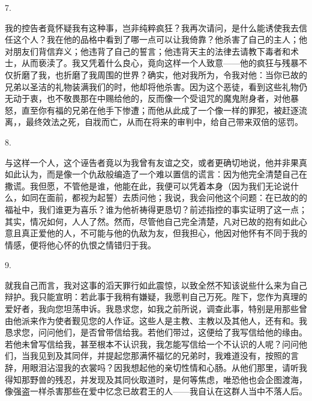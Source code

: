 7. \par

我的控告者竟怀疑我有这种事，岂非纯粹疯狂？我再次请问，是什么能诱使我去信任这个人？我在他的品格中看到了哪一点可以让我倚靠？他杀害了自己的主人；他对朋友们背信弃义；他违背了自己的誓言；他违背天主的法律去请教下毒者和术士，从而亵渎了。我又凭着什么良心，竟向这样一个人致意——他的疯狂与残暴不仅折磨了我，也折磨了我周围的世界？确实，他对我所为，令我对他：当你已故的兄弟以圣洁的礼物装满我们的时，他却将他杀害。因为这个恶徒，看到这些礼物仍无动于衷，也不敬畏那在中赐给他的，反而像一个受诅咒的魔鬼附身者，对他暴怒，直至你有福的兄弟在他手下惨遭；而他从此成了一个像一样的罪犯，被赶逐流离，，最终效法之死，自戕而亡，从而在将来的审判中，给自己带来双倍的惩罚。\par

8. \par

与这样一个人，这个诬告者竟以为我曾有友谊之交，或者更确切地说，他并非果真如此认为，而是像一个仇敌般编造了一个难以置信的谎言：因为他完全清楚自己在撒谎。我但愿，不管他是谁，他能在此，我便可以凭着本身（因为我们无论说什么，如同在面前，都视为起誓）去质问他；我说，我会问他这个问题：在已故的的福祉中，我们谁更为喜乐？谁为他祈祷得更恳切？前述指控的事实证明了这一点；其实，情况如何，人人了然。然而，尽管他自己完全清楚，凡对已故的抱有如此心意且真正爱他的人，不可能与他的仇敌为友，但我担心，他因对他怀有不同于我的情感，便将他心怀的仇恨之情错归于我。\par

9. \par

就我自己而言，我对这事的滔天罪行如此震惊，以致全然不知该说些什么来为自己辩护。我只能宣明：若此事于我稍有嫌疑，我愿判自己万死。陛下，您作为真理的爱好者，我向您坦荡申诉。我恳求您，如我之前所说，调查此事，特别是用那些曾由他派来作为使者觐见您的人作证。这些人是主教、主教以及其他人，还有和。我恳求您，问问他们，是否曾带信给我。若他们带过，这便给了我写信给他的缘由。若他未曾写信给我，甚至根本不认识我，我怎能写信给一个不认识的人呢？问问他们，当我见到及其同伴，并提起您那满怀福忆的兄弟时，我难道没有，按照的言辞，用眼泪沾湿我的衣裳吗？因我想起他的亲切性情和心肠。从他们那里，请听我得知那野兽的残忍，并发现及其同伙取道时，是何等焦虑，唯恐他也会企图渡海，像强盗一样杀害那些在爱中忆念已故君王的人——我自认在这群人当中不落人后。\par


